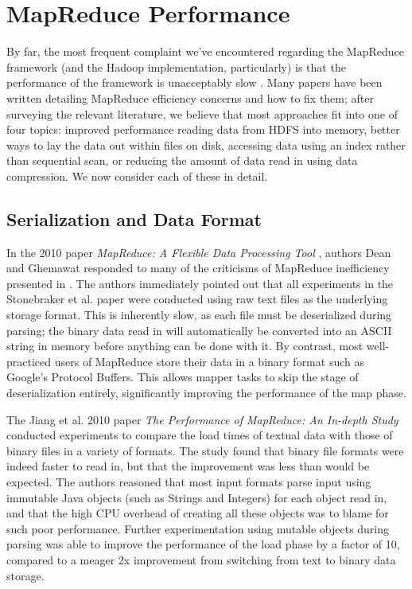 \documentclass[twocolumn]{article}
\begin{document}
\section{MapReduce Performance}

By far, the most frequent complaint we've encountered regarding the MapReduce
framework (and the Hadoop implementation, particularly) is that the performance
of the framework is unacceptably slow \cite{ref:friends-or-foes}.  Many papers
have been written detailing
MapReduce efficiency concerns and how to fix them; after surveying the relevant literature,
we believe that most approaches fit into one of four topics: improved performance reading
data from HDFS into memory, better ways to lay the data out within files on disk,
accessing data using an index rather than sequential scan, or reducing the
amount of data read in using data compression.  We now consider each
of these in detail.

\subsection{Serialization and Data Format}

In the 2010 paper \emph{MapReduce: A Flexible Data Processing Tool} \cite{ref:friends-or-foes-resp},
authors Dean and Ghemawat responded to many of the criticisms of MapReduce inefficiency
presented in \cite{ref:friends-or-foes}.  The authors immediately pointed out that all experiments
in the Stonebraker et al. paper were conducted using raw text files as the underlying storage
format.  This is inherently slow, as each file must be deserialized during parsing; the binary
data read in will automatically be converted into an ASCII string in memory before anything can
be done with it.  By contrast, most well-practiced users of MapReduce store their data in a binary
format such as Google's Protocol Buffers.
This allows mapper tasks to skip the stage of deserialization entirely, significantly
improving the performance of the map phase.

The Jiang et al. 2010 paper \emph{The Performance of MapReduce: An In-depth Study}
\cite{ref:perf-study} conducted experiments to compare
the load times of textual data with those of binary files in a variety of formats.
The study found that binary file formats were indeed faster to read in, but that the
improvement was less than would be expected.  The authors reasoned that most input formats
parse input using immutable Java objects (such as Strings and Integers) for each object
read in, and that the high CPU overhead of creating all
these objects was to blame for such poor performance.  Further experimentation
using mutable objects during parsing was able to improve the performance of the load phase
by a factor of 10, compared to a meager 2x improvement from switching from text to binary
data storage.
\end{document}
